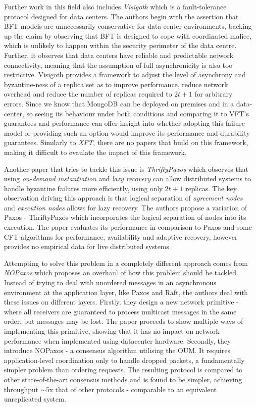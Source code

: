 Further work in this field also includes \textit{Visigoth} \citep{visigoth} which is a fault-tolerance protocol designed for data centers. The authors begin with the assertion that BFT models are unnecessarily conservative for data center environments, backing up the claim by observing that BFT is designed to cope with coordinated malice, which is unlikely to happen within the security perimeter of the data centre. Further, it observes that data centers have reliable and predictable network connectivity, meaning that the assumption of full asynchronicity is also too restrictive. Visigoth provides a framework to adjust the level of asynchrony and byzantine-ness of a replica set as to improve performance, reduce network overhead and reduce the number of replicas required to $2t+1$ for arbitrary errors. Since we know that MongoDB can be deployed on premises and in a data-center, so seeing its behaviour under both conditions and comparing it to VFT's guarantees and performance can offer insight into whether adopting this failure model or providing such an option would improve its performance and durability guarantees. Similarly to \textit{XFT}, there are no papers that build on this framework, making it difficult to evaulate the impact of this framework.

Another paper that tries to tackle this issue is \textit{ThriftyPaxos} \citep{thriftypaxos} which observes that using \textit{on-demand instantiation} \citep{cheappaxos, zz} and \textit{lazy recovery} \citep{lazyrep, lazyrep-availability} can allow distributed systems to handle byzantine failures more efficiently, using only $2t+1$ replicas. The key observation driving this approach is that logical separation of \textit{agreement nodes} and \textit{execution nodes} allows for lazy recovery. The authors propose a variation of Paxos - ThriftyPaxos which incorporates the logical separation of nodes into its execution. The paper evaluates its performance in comparison to Paxos and some CFT algorithms for performance, availability and adaptive recovery, however provides no empirical data for live distributed systems.

Attempting to solve this problem in a completely different approach comes from \textit{NOPaxos} \citep{consensus-network-ordering} which proposes an overhaul of how this problem should be tackled. Instead of trying to deal with unordered messages in an asynchronous environment at the application layer, like Paxos and Raft, the authors deal with these issues on different layers. Firstly, they design a new network primitive -   where all receivers are guaranteed to process multicast messages in the same order, but messages may be lost. The paper proceeds to show multiple ways of implementing this primitive, showing that it has no impact on network performance when implemented using datacenter hardware. Secondly, they introduce NOPaxos - a consensus algorithm utilising the OUM. It requires application-level coordination only to handle dropped packets, a fundamentally simpler problem than ordering requests. The resulting protocol is compared to other state-of-the-art consensus methods and is found to be simpler, achieving throughput $\sim$5x that of other protocols - comparable to an equivalent unreplicated system. 

